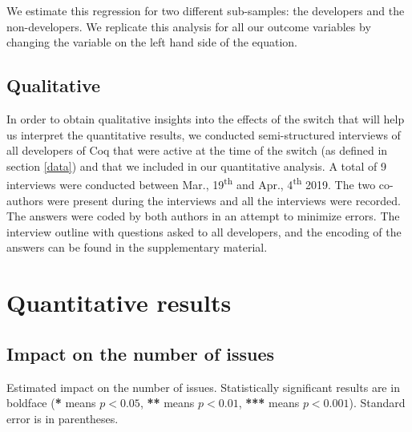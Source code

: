 \documentclass[conference]{IEEEtran}
\begin{document}
We estimate this regression for two different sub-samples: the developers and the non-developers. We replicate this analysis for all our outcome variables by changing the variable on the left hand side of the equation. 

\subsection{Qualitative}

In order to obtain qualitative insights into the effects of the switch that will help us interpret the quantitative results, we conducted semi-structured interviews of all developers of Coq that were active at the time of the switch (as defined in section \ref{data}) and that we included in our quantitative analysis. A total of 9 interviews were conducted between Mar., 19\textsuperscript{th} and Apr., 4\textsuperscript{th} 2019.
The two co-authors were present during the interviews and all the interviews were recorded. The answers were coded by both authors in an attempt to minimize errors. The interview outline with questions asked to all developers, and the encoding of the answers can be found in the supplementary material. 

\section{Quantitative results}
\label{results}
\subsection{Impact on the number of issues}

\begin{table}
\centering
\caption{Estimated impact on the number of issues. Statistically significant results are in boldface (\textbf{*} means $p<0.05$, \textbf{**} means $p<0.01$, \textbf{***} means $p<0.001$). Standard error is in parentheses.}
\label{tab:bug_nb}

\end{table}
\end{document}
